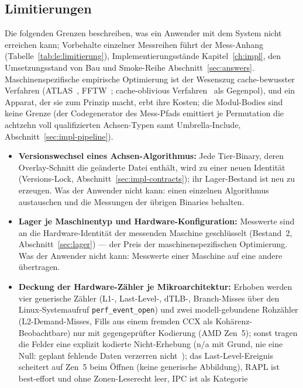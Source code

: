 \begin{nurkurz}
\section{Limitierungen}\label{sec:limitations}
Die folgenden Grenzen beschreiben, was ein Anwender mit dem System nicht erreichen kann; Vorbehalte
einzelner
Messreihen führt der Mess-Anhang (Tabelle~\ref{tab:le:limitierung}), Implementierungsstände
Kapitel~\ref{ch:impl}, den Umsetzungsstand von Bau und Smoke-Reihe Abschnitt~\ref{sec:answers}.
Maschinenspezifische empirische Optimierung
ist der Wesenszug cache-bewusster Verfahren (ATLAS~\cite{whaley2001atlas}, FFTW~\cite{frigo1998fftw};
cache-oblivious Verfahren~\cite{frigo1999cache} als Gegenpol), und ein Apparat, der sie zum Prinzip macht,
erbt ihre Kosten; die Modul-Bodies sind keine Grenze (der Codegenerator des Mess-Pfads emittiert je
Permutation die achtzehn voll qualifizierten Achsen-Typen samt Umbrella-Include,
Abschnitt~\ref{sec:impl-pipeline}).
\begin{itemize}
  \item \textbf{Versionswechsel eines Achsen-Algorithmus:} Jede Tier-Binary, deren Overlay-Schnitt die
  geänderte Datei enthält, wird zu einer neuen Identität (Versions-Lock,
  Abschnitt~\ref{sec:impl-contracts});
  ihr Lager-Bestand ist neu zu erzeugen. Was der Anwender nicht kann: einen einzelnen Algorithmus
  austauschen
  und die Messungen der übrigen Binaries behalten.
  \item \textbf{Lager je Maschinentyp und Hardware-Konfiguration:} Messwerte sind an die Hardware-Identität
  der messenden Maschine geschlüsselt (Bestand~2, Abschnitt~\ref{sec:lager}) --- der Preis der
  maschinenspezifischen Optimierung. Was der Anwender nicht kann: Messwerte einer Maschine auf eine andere
  übertragen.
  \item \textbf{Deckung der Hardware-Zähler je Mikroarchitektur:} Erhoben werden vier generische Zähler
  (L1-, Last-Level-, dTLB-, Branch-Misses über den Linux-Systemaufruf \texttt{perf\_event\_open}) und zwei
  modell-gebundene Rohzähler (L2-Demand-Misses, Fills aus einem fremden CCX als Kohärenz-Beobachtbare) nur
  mit gegengeprüfter Kodierung (AMD Zen~5); sonst tragen die Felder eine explizit kodierte Nicht-Erhebung
  (n/a mit Grund, nie eine Null: geplant fehlende Daten verzerren
  nicht~\cite{graham2006planned,graham2009missing}); das Last-Level-Ereignis scheitert auf Zen~5 beim Öffnen
  (keine generische Abbildung), RAPL ist best-effort und ohne Zonen-Leserecht leer, IPC ist als Kategorie

\end{itemize}
\end{nurkurz}
